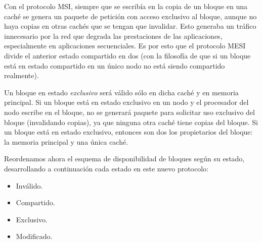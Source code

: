 Con el protocolo MSI, siempre que se escribía en la copia de un bloque en una caché se genera un paquete de petición con acceso exclusivo al bloque, aunque no haya copias en otras cachés que se tengan que invalidar. Esto generaba un tráfico innecesario por la red que degrada las prestaciones de las aplicaciones, especialmente en aplicaciones secuenciales. Es por esto que el protocolo MESI divide el anterior estado compartido en dos (con la filosofía de que si un bloque está en estado compartido en un único nodo no está siendo compartido realmente).

Un bloque en estado \emph{exclusivo} será válido sólo en dicha caché y en memoria principal. Si un bloque está en estado exclusivo en un nodo y el procesador del nodo escribe en el bloque, no se generará paquete para solicitar uso exclusivo del bloque (invalidando copias), ya que ninguna otra caché tiene copias del bloque. Si un bloque está en estado exclusivo, entonces son dos los propietarios del bloque: la memoria principal y una única caché. 

Reordenamos ahora el esquema de disponibilidad de bloques según su estado, desarrollando a continuación cada estado en este nuevo protocolo:
\begin{itemize}
    \item Inválido.
    \item Compartido.
    \item Exclusivo.
    \item Modificado.
\end{itemize}

